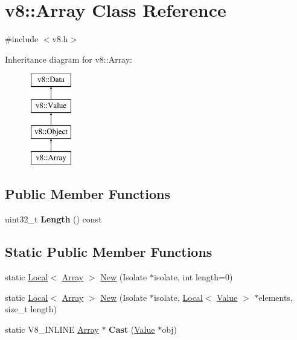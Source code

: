 \hypertarget{classv8_1_1Array}{}\section{v8\+:\+:Array Class Reference}
\label{classv8_1_1Array}


{\ttfamily \#include $<$v8.\+h$>$}

Inheritance diagram for v8\+:\+:Array\+:\begin{figure}[H]
\begin{center}
\leavevmode
\includegraphics[height=4.000000cm]{classv8_1_1Array}
\end{center}
\end{figure}
\subsection*{Public Member Functions}
\begin{DoxyCompactItemize}
\item 
\mbox{\label{classv8_1_1Array_ad6b33c7dd543044ca2311c000a1642dd}} 
uint32\+\_\+t {\bfseries Length} () const
\end{DoxyCompactItemize}
\subsection*{Static Public Member Functions}
\begin{DoxyCompactItemize}
\item 
static \mbox{\hyperlink{classv8_1_1Local}{Local}}$<$ \mbox{\hyperlink{classv8_1_1Array}{Array}} $>$ \mbox{\hyperlink{classv8_1_1Array_a892f18fe6a25dfc0bc7b435759a30226}{New}} (Isolate $\ast$isolate, int length=0)
\item 
static \mbox{\hyperlink{classv8_1_1Local}{Local}}$<$ \mbox{\hyperlink{classv8_1_1Array}{Array}} $>$ \mbox{\hyperlink{classv8_1_1Array_a748ab878a787989d9970d6e647677974}{New}} (Isolate $\ast$isolate, \mbox{\hyperlink{classv8_1_1Local}{Local}}$<$ \mbox{\hyperlink{classv8_1_1Value}{Value}} $>$ $\ast$elements, size\+\_\+t length)
\item 
\mbox{\label{classv8_1_1Array_ae56792766f8513395c3ebe8c29afde4b}} 
static V8\+\_\+\+I\+N\+L\+I\+NE \mbox{\hyperlink{classv8_1_1Array}{Array}} $\ast$ {\bfseries Cast} (\mbox{\hyperlink{classv8_1_1Value}{Value}} $\ast$obj)
\end{DoxyCompactItemize}


